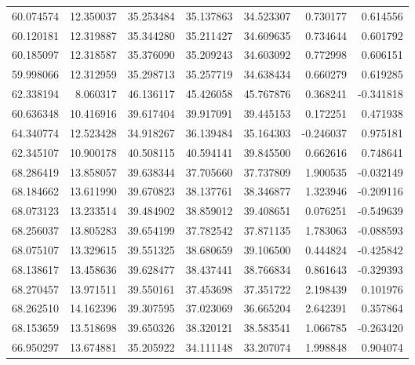 \begin{tabular}{rrrrrrr}
 60.074574 &  12.350037 &         35.253484 &         35.137863 &         34.523307 &  0.730177 &  0.614556 \\
 60.120181 &  12.319887 &         35.344280 &         35.211427 &         34.609635 &  0.734644 &  0.601792 \\
 60.185097 &  12.318587 &         35.376090 &         35.209243 &         34.603092 &  0.772998 &  0.606151 \\
 59.998066 &  12.312959 &         35.298713 &         35.257719 &         34.638434 &  0.660279 &  0.619285 \\
 62.338194 &   8.060317 &         46.136117 &         45.426058 &         45.767876 &  0.368241 & -0.341818 \\
 60.636348 &  10.416916 &         39.617404 &         39.917091 &         39.445153 &  0.172251 &  0.471938 \\
 64.340774 &  12.523428 &         34.918267 &         36.139484 &         35.164303 & -0.246037 &  0.975181 \\
 62.345107 &  10.900178 &         40.508115 &         40.594141 &         39.845500 &  0.662616 &  0.748641 \\
 68.286419 &  13.858057 &         39.638344 &         37.705660 &         37.737809 &  1.900535 & -0.032149 \\
 68.184662 &  13.611990 &         39.670823 &         38.137761 &         38.346877 &  1.323946 & -0.209116 \\
 68.073123 &  13.233514 &         39.484902 &         38.859012 &         39.408651 &  0.076251 & -0.549639 \\
 68.256037 &  13.805283 &         39.654199 &         37.782542 &         37.871135 &  1.783063 & -0.088593 \\
 68.075107 &  13.329615 &         39.551325 &         38.680659 &         39.106500 &  0.444824 & -0.425842 \\
 68.138617 &  13.458636 &         39.628477 &         38.437441 &         38.766834 &  0.861643 & -0.329393 \\
 68.270457 &  13.971511 &         39.550161 &         37.453698 &         37.351722 &  2.198439 &  0.101976 \\
 68.262510 &  14.162396 &         39.307595 &         37.023069 &         36.665204 &  2.642391 &  0.357864 \\
 68.153659 &  13.518698 &         39.650326 &         38.320121 &         38.583541 &  1.066785 & -0.263420 \\
 66.950297 &  13.674881 &         35.205922 &         34.111148 &         33.207074 &  1.998848 &  0.904074 \\

\end{tabular}
